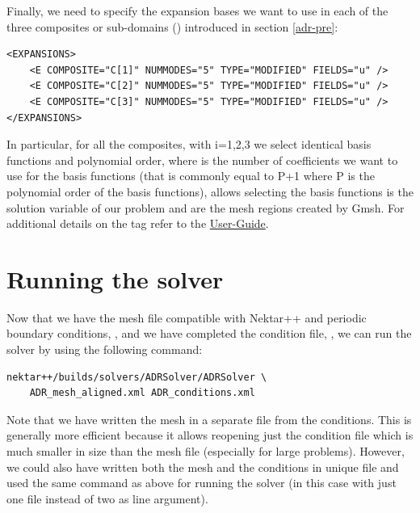 Finally, we need to specify the expansion bases we want to use in each of the three 
composites or sub-domains () introduced in section \ref{adr-pre}:
%
\begin{lstlisting}[style=XMLStyle]
<EXPANSIONS>
    <E COMPOSITE="C[1]" NUMMODES="5" TYPE="MODIFIED" FIELDS="u" />
    <E COMPOSITE="C[2]" NUMMODES="5" TYPE="MODIFIED" FIELDS="u" />
    <E COMPOSITE="C[3]" NUMMODES="5" TYPE="MODIFIED" FIELDS="u" />
</EXPANSIONS>
\end{lstlisting}
%
In particular, for all the composites,  with i=1,2,3 we select 
identical basis functions and polynomial order, where  is the number 
of coefficients we want to use for the basis functions (that is commonly equal to P+1 
where P is the polynomial order of the basis functions),  allows selecting 
the basis functions  is the solution variable of our problem and  
are the mesh regions created by Gmsh. For additional details on the  
tag refer to the \href{http://www.nektar.info/downloads/8}{User-Guide}.




\section{Running the solver}
\label{adr-running}
Now that we have the mesh file compatible with Nektar++ and periodic boundary conditions, 
, and we have completed the condition file, , 
we can run the solver by using the following command:
%
\begin{lstlisting}[style=BashInputStyle]
nektar++/builds/solvers/ADRSolver/ADRSolver \
    ADR_mesh_aligned.xml ADR_conditions.xml
\end{lstlisting}
%
Note that we have written the mesh in a separate file from the conditions. This is generally more efficient 
because it allows reopening just the condition file which is much smaller in size than the mesh file (especially 
for large problems). However, we could also have written both the mesh and the conditions in unique file and 
used the same command as above for running the solver (in this case with just one file instead of two as line 
argument).

